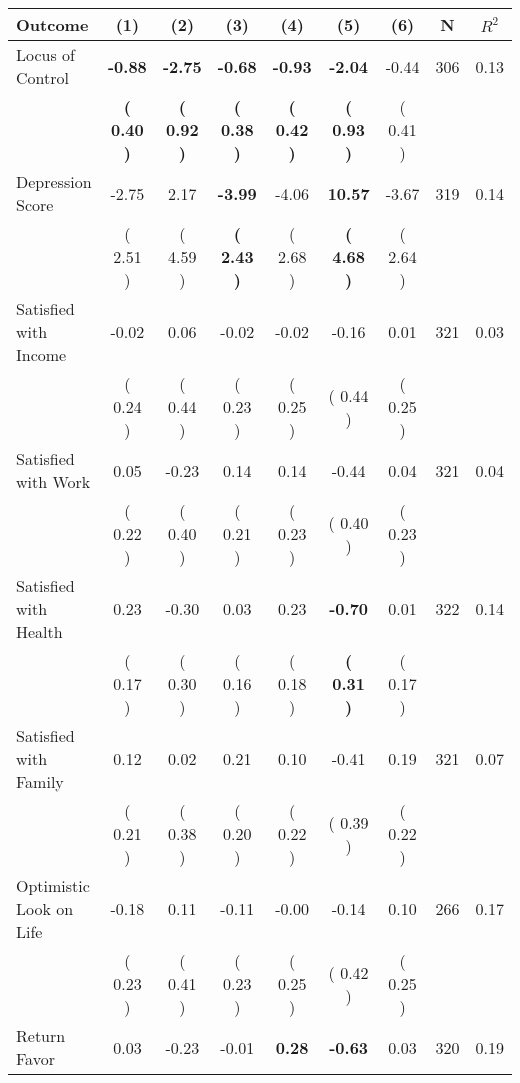 \begin{tabular}{lcccccccc}
\toprule
 \textbf{Outcome} & \textbf{(1)} & \textbf{(2)} & \textbf{(3)} & \textbf{(4)} & \textbf{(5)} & \textbf{(6)} & \textbf{N} & \textbf{$ R^2$} \\
\midrule
Locus of Control & \textbf{    -0.88} & \textbf{    -2.75} & \textbf{    -0.68} & \textbf{    -0.93} & \textbf{    -2.04} &     -0.44 & 306 &       0.13 \\ 
 & \textbf{(     0.40 )} & \textbf{(     0.92 )} & \textbf{(     0.38 )} & \textbf{(     0.42 )} & \textbf{(     0.93 )} & (     0.41 ) & \\
Depression Score &     -2.75 &      2.17 & \textbf{    -3.99} &     -4.06 & \textbf{    10.57} &     -3.67 & 319 &       0.14 \\ 
 & (     2.51 ) & (     4.59 ) & \textbf{(     2.43 )} & (     2.68 ) & \textbf{(     4.68 )} & (     2.64 ) & \\
Satisfied with Income &     -0.02 &      0.06 &     -0.02 &     -0.02 &     -0.16 &      0.01 & 321 &       0.03 \\ 
 & (     0.24 ) & (     0.44 ) & (     0.23 ) & (     0.25 ) & (     0.44 ) & (     0.25 ) & \\
Satisfied with Work &      0.05 &     -0.23 &      0.14 &      0.14 &     -0.44 &      0.04 & 321 &       0.04 \\ 
 & (     0.22 ) & (     0.40 ) & (     0.21 ) & (     0.23 ) & (     0.40 ) & (     0.23 ) & \\
Satisfied with Health &      0.23 &     -0.30 &      0.03 &      0.23 & \textbf{    -0.70} &      0.01 & 322 &       0.14 \\ 
 & (     0.17 ) & (     0.30 ) & (     0.16 ) & (     0.18 ) & \textbf{(     0.31 )} & (     0.17 ) & \\
Satisfied with Family &      0.12 &      0.02 &      0.21 &      0.10 &     -0.41 &      0.19 & 321 &       0.07 \\ 
 & (     0.21 ) & (     0.38 ) & (     0.20 ) & (     0.22 ) & (     0.39 ) & (     0.22 ) & \\
Optimistic Look on Life &     -0.18 &      0.11 &     -0.11 &     -0.00 &     -0.14 &      0.10 & 266 &       0.17 \\ 
 & (     0.23 ) & (     0.41 ) & (     0.23 ) & (     0.25 ) & (     0.42 ) & (     0.25 ) & \\
Return Favor &      0.03 &     -0.23 &     -0.01 & \textbf{     0.28} & \textbf{    -0.63} &      0.03 & 320 &       0.19 \\ 

\end{tabular}

